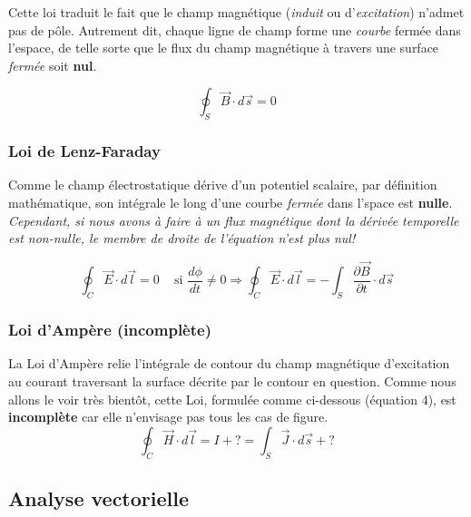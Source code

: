 \documentclass[a4paper,12pt]{article}
\begin{document}
Cette loi traduit le fait que le champ magnétique (\textit{induit} ou d'\textit{excitation}) n'admet pas de pôle. 
Autrement dit, chaque ligne de champ forme une \textit{courbe} fermée dans l'espace, de telle sorte que le flux 
du champ magnétique à travers une surface \textit{fermée} soit \textbf{nul}.

\begin{equation}
 \oint_{S} \vec{B} \cdot d\vec{s} = 0
 \label{MonoPoleIntegral}
\end{equation}

\subsubsection{Loi de Lenz-Faraday}

Comme le champ électrostatique dérive d'un potentiel scalaire, par définition mathématique, son intégrale le long 
d'une courbe \textit{fermée} dans l'space est \textbf{nulle}. %
\textit{Cependant, si nous avons à faire à un flux magnétique dont la dérivée temporelle est non-nulle, le membre de droite de l'équation n'est plus nul!}

\begin{equation}
 \oint_{C} \vec{E} \cdot d\vec{l} = 0 \hspace{10pt} \mbox{ si } \frac{d\phi}{dt} \not = 0 \Rightarrow  \oint_{C} \vec{E} \cdot d\vec{l} = -\int_{S} \frac{\partial \vec{B}}{\partial t} \cdot d\vec{s}
 \label{PotentielIntegral}
\end{equation}

\newpage

\subsubsection{Loi d'Ampère (incomplète)}

La Loi d'Ampère relie l'intégrale de contour du champ magnétique d'excitation au courant traversant la surface décrite par le contour en question. 
Comme nous allons le voir très bientôt, cette Loi, formulée comme ci-dessous (équation 4), est \textbf{incomplète} car elle n'envisage pas tous les cas de figure.
\begin{equation}
 \oint_{C} \vec{H} \cdot d\vec{l} = I + ? = \int_{S} \vec{J} \cdot d\vec{s} + ? 
 \label{AmpèreIntegral}
\end{equation}

\subsection{Analyse vectorielle}
\end{document}
